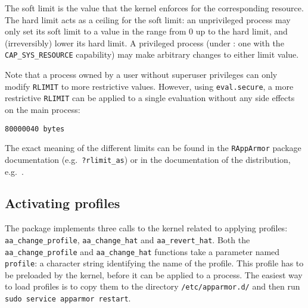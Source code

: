 The soft limit is the value that the kernel enforces for the corresponding
resource. The hard limit acts as a ceiling for the soft limit: an unprivileged
process may only set its soft limit to a value in the range from 0 up to the
hard limit, and (irreversibly) lower its hard limit. A  privileged process
(under  \Linux:  one  with  the \texttt{CAP\_SYS\_RESOURCE} capability) may make
arbitrary changes to either limit value.  \citep{linuxrlimit}



Note that a process owned by a user without superuser privileges can only modify
\texttt{RLIMIT} to more restrictive values. However, using \texttt{eval.secure},
a more restrictive \texttt{RLIMIT} can be applied to a single evaluation without
any side effects on the main process:

\begin{knitrout}\mycodesize
{}\color{fgcolor}\begin{kframe}
\begin{alltt}
 \hlkwb{<-} \hlstd{(}\hlstd{(}\hlstd{),}  \hlstd{=}  \hlopt{*}  \hlopt{*} \hlstd{)}
\end{alltt}


{\ttfamily\noindent\bfseries\color{errorcolor}{\#\# Error: cannot allocate vector of size 76.3 Mb}}\begin{alltt}
 \hlkwb{<-} \hlstd{(}\hlstd{)}
\end{alltt}
\begin{verbatim}
80000040 bytes
\end{verbatim}
\end{kframe}
\end{knitrout}


The exact meaning of the different limits can be found in the \texttt{RAppArmor}
package documentation (e.g.\ \texttt{?rlimit\_as}) or in the documentation of
the distribution, e.g.\ \cite{ubunturlimit}.

\subsection{Activating \AppArmor profiles}

The \RAppArmor package implements three calls to the \Linux kernel related
to applying \AppArmor profiles: \texttt{aa\_change\_profile},
\texttt{aa\_change\_hat} and \texttt{aa\_revert\_hat}. Both the
\texttt{aa\_change\_profile} and \texttt{aa\_change\_hat} functions take a
parameter named \texttt{profile}: a character string identifying the name of
the profile. This profile has to be preloaded by the kernel, before it can be
applied to a process. The easiest way to load profiles is to copy them to the
directory \texttt{/etc/apparmor.d/} and then run \texttt{sudo service apparmor
restart}.

